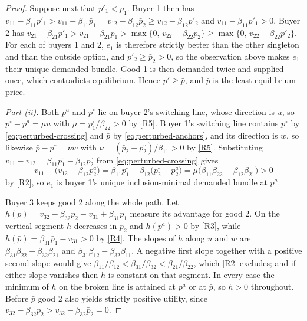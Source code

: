 \begin{proof}
Suppose next that $p'_1<\bar p_1$. Buyer 1 then has $v_{11}-\beta_{11}p'_1>v_{11}-\beta_{11}\bar p_1=v_{12}-\beta_{12}\bar p_2\ge v_{12}-\beta_{12}p'_2$ and $v_{11}-\beta_{11}p'_1>0$. Buyer 2 has $v_{21}-\beta_{21}p'_1>v_{21}-\beta_{21}\bar p_1>\max\{0,\,v_{22}-\beta_{22}\bar p_2\}\ge\max\{0,\,v_{22}-\beta_{22}p'_2\}$. For each of buyers 1 and 2, $e_1$ is therefore strictly better than the other singleton and than the outside option, and $p'_2\ge\bar p_2>0$, so the observation above makes $e_1$ their unique demanded bundle. Good 1 is then demanded twice and supplied once, which contradicts equilibrium. Hence $p'\ge\bar p$, and $\bar p$ is the least equilibrium price.

\emph{Part \textup{(ii)}.} Both $p^a$ and $p^\circ$ lie on buyer 2's switching line, whose direction is $u$, so $p^\circ-p^a=\mu u$ with $\mu=p^\circ_1/\beta_{22}>0$ by \ref{R5}. Buyer 1's switching line contains $p^\circ$ by \eqref{eq:perturbed-crossing} and $\bar p$ by \eqref{eq:perturbed-anchors}, and its direction is $w$, so likewise $\bar p-p^\circ=\nu w$ with $\nu=(\bar p_2-p^\circ_2)/\beta_{11}>0$ by \ref{R5}. Substituting $v_{11}-v_{12}=\beta_{11}p^\circ_1-\beta_{12}p^\circ_2$ from \eqref{eq:perturbed-crossing} gives
\begin{equation}\label{eq:buyer1-first-segment}
v_{11}-\bigl(v_{12}-\beta_{12}p^a_2\bigr)
=\beta_{11}p^\circ_1-\beta_{12}\bigl(p^\circ_2-p^a_2\bigr)
=\mu\bigl(\beta_{11}\beta_{22}-\beta_{12}\beta_{21}\bigr)>0
\end{equation}
by \ref{R2}, so $e_1$ is buyer 1's unique inclusion-minimal demanded bundle at $p^a$.

Buyer 3 keeps good 2 along the whole path. Let $h(p)=v_{32}-\beta_{32}p_2-v_{31}+\beta_{31}p_1$ measure its advantage for good 2. On the vertical segment $h$ decreases in $p_2$ and $h(p^a)>0$ by \ref{R3}, while $h(\bar p)=\beta_{31}\bar p_1-v_{31}>0$ by \ref{R4}. The slopes of $h$ along $u$ and $w$ are $\beta_{31}\beta_{22}-\beta_{32}\beta_{21}$ and $\beta_{31}\beta_{12}-\beta_{32}\beta_{11}$. A negative first slope together with a positive second slope would give $\beta_{11}/\beta_{12}<\beta_{31}/\beta_{32}<\beta_{21}/\beta_{22}$, which \ref{R2} excludes; and if either slope vanishes then $h$ is constant on that segment. In every case the minimum of $h$ on the broken line is attained at $p^a$ or at $\bar p$, so $h>0$ throughout. Before $\bar p$ good 2 also yields strictly positive utility, since $v_{32}-\beta_{32}p_2>v_{32}-\beta_{32}\bar p_2=0$.


\end{proof}
